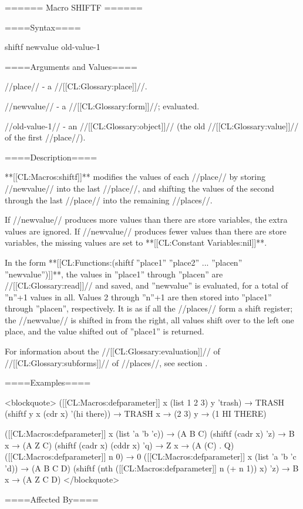 ====== Macro SHIFTF ======

====Syntax====

\DefmacWithValues shiftf { newvalue} {old-value-1}

====Arguments and Values====

//place// - a //[[CL:Glossary:place]]//.

//newvalue// - a //[[CL:Glossary:form]]//; evaluated.

//old-value-1// - an //[[CL:Glossary:object]]// (the old //[[CL:Glossary:value]]// of the first //place//).

====Description====

**[[CL:Macros:shiftf]]** modifies the values of each //place// by storing //newvalue// into the last //place//, and shifting the values of the second through the last //place// into the remaining //places//.

If //newvalue// produces more values than there are store variables, the extra values are ignored. If //newvalue// produces fewer values than there are store variables, the missing values are set to **[[CL:Constant Variables:nil]]**.

In the form **[[CL:Functions:(shiftf ''place1'' ''place2'' ... ''placen'' ''newvalue'')]]**, the values in ''place1'' through ''placen'' are //[[CL:Glossary:read]]// and saved, and ''newvalue'' is evaluated, for a total of ''n''+1 values in all. Values 2 through ''n''+1 are then stored into ''place1'' through ''placen'', respectively. It is as if all the //places// form a shift register; the //newvalue// is shifted in from the right, all values shift over to the left one place, and the value shifted out of ''place1'' is returned.

For information about the //[[CL:Glossary:evaluation]]// of //[[CL:Glossary:subforms]]// of //places//, see section {\secref\GenRefSubFormEval}.

====Examples====

<blockquote> ([[CL:Macros:defparameter]] x (list 1 2 3) y 'trash) → TRASH (shiftf y x (cdr x) '(hi there)) → TRASH x → (2 3) y → (1 HI THERE)

([[CL:Macros:defparameter]] x (list 'a 'b 'c)) → (A B C) (shiftf (cadr x) 'z) → B x → (A Z C) (shiftf (cadr x) (cddr x) 'q) → Z x → (A (C) . Q) ([[CL:Macros:defparameter]] n 0) → 0 ([[CL:Macros:defparameter]] x (list 'a 'b 'c 'd)) → (A B C D) (shiftf (nth ([[CL:Macros:defparameter]] n (+ n 1)) x) 'z) → B x → (A Z C D) </blockquote>

====Affected By====

